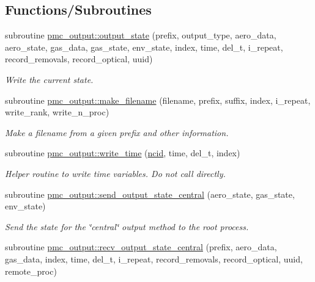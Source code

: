 \subsection*{Functions/\+Subroutines}
\begin{DoxyCompactItemize}
\item 
subroutine \mbox{\hyperlink{namespacepmc__output_a3450534dae32c9b056de1292c80e0472}{pmc\+\_\+output\+::output\+\_\+state}} (prefix, output\+\_\+type, aero\+\_\+data, aero\+\_\+state, gas\+\_\+data, gas\+\_\+state, env\+\_\+state, index, time, del\+\_\+t, i\+\_\+repeat, record\+\_\+removals, record\+\_\+optical, uuid)
\begin{DoxyCompactList}\small\item\em Write the current state. \end{DoxyCompactList}\item 
subroutine \mbox{\hyperlink{namespacepmc__output_a28f96c3135783c6d5357fb82bbc77b3e}{pmc\+\_\+output\+::make\+\_\+filename}} (filename, prefix, suffix, index, i\+\_\+repeat, write\+\_\+rank, write\+\_\+n\+\_\+proc)
\begin{DoxyCompactList}\small\item\em Make a filename from a given prefix and other information. \end{DoxyCompactList}\item 
subroutine \mbox{\hyperlink{namespacepmc__output_a3ca0a8e4963dc8daf105db36fedda4ea}{pmc\+\_\+output\+::write\+\_\+time}} (\mbox{\hyperlink{fractal_8_f90_a4e89f3f850921ff84a6dfce8b166ad50}{ncid}}, time, del\+\_\+t, index)
\begin{DoxyCompactList}\small\item\em Helper routine to write time variables. Do not call directly. \end{DoxyCompactList}\item 
subroutine \mbox{\hyperlink{namespacepmc__output_a103f78373256be1b8718a1da9d46da8d}{pmc\+\_\+output\+::send\+\_\+output\+\_\+state\+\_\+central}} (aero\+\_\+state, gas\+\_\+state, env\+\_\+state)
\begin{DoxyCompactList}\small\item\em Send the state for the \char`\"{}central\char`\"{} output method to the root process. \end{DoxyCompactList}\item 
subroutine \mbox{\hyperlink{namespacepmc__output_a500e8f765493908b09510fcf8b497e3e}{pmc\+\_\+output\+::recv\+\_\+output\+\_\+state\+\_\+central}} (prefix, aero\+\_\+data, gas\+\_\+data, index, time, del\+\_\+t, i\+\_\+repeat, record\+\_\+removals, record\+\_\+optical, uuid, remote\+\_\+proc)

\end{DoxyCompactItemize}
